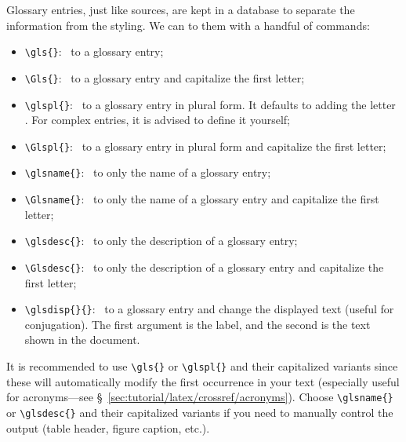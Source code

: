 Glossary entries, just like \glspl{source}, are kept in a database to separate the information from the styling. We can  to them with a handful of \glspl{command}:
\begin{itemize}
    \item \texttt{\textbackslash{}gls\{\}}:~ to a glossary entry;
    \item \texttt{\textbackslash{}Gls\{\}}:~ to a glossary entry and capitalize the first letter;
    \item \texttt{\textbackslash{}glspl\{\}}:~ to a glossary entry in plural form. It defaults to adding the letter . For complex entries, it is advised to define it yourself;
    \item \texttt{\textbackslash{}Glspl\{\}}:~ to a glossary entry in plural form and capitalize the first letter;
    \item \texttt{\textbackslash{}glsname\{\}}:~ to only the name of a glossary entry;
    \item \texttt{\textbackslash{}Glsname\{\}}:~ to only the name of a glossary entry and capitalize the first letter;
    \item \texttt{\textbackslash{}glsdesc\{\}}:~ to only the description of a glossary entry;
    \item \texttt{\textbackslash{}Glsdesc\{\}}:~ to only the description of a glossary entry and capitalize the first letter;
    \item \texttt{\textbackslash{}glsdisp\{\}\{\}}:~ to a glossary entry and change the displayed text (useful for conjugation). The first argument is the \gls{label}, and the second is the text shown in the document.
\end{itemize}

It is recommended to use \texttt{\textbackslash{}gls\{\}} or \texttt{\textbackslash{}glspl\{\}} and their capitalized variants since these will automatically modify the first occurrence in your text (especially useful for acronyms---see \S~\ref{sec:tutorial/latex/crossref/acronyms}). Choose \texttt{\textbackslash{}glsname\{\}} or \texttt{\textbackslash{}glsdesc\{\}} and their capitalized variants if you need to manually control the output (table header, figure caption, etc.).

